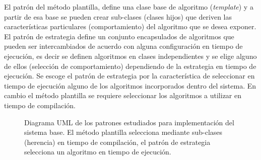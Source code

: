 El patrón del método plantilla, define una clase base de algoritmo (\textit{template}) y a partir de esa base se pueden crear sub-clases (clases hijos) que deriven las características particulares (comportamiento) del algoritmo que se desea exponer. El patrón de estrategia define un conjunto encapsulados de algoritmos que pueden ser intercambiados de acuerdo con alguna configuración en tiempo de ejecución, es decir se definen algoritmos en clases independientes y se elige alguno de ellos (selección de comportamiento) dependiendo de la estrategia en tiempo de ejecución. Se escoge el patrón de estrategia por la característica de seleccionar en tiempo de ejecución alguno de los algoritmos incorporados dentro del sistema. En cambio el método plantilla se requiere seleccionar los algoritmos a utilizar en tiempo de compilación.

\begin{figure}[h!]
\centering %
\caption[Diagrama UML de patrones de diseño \textit{Plantilla} y \textit{Estrategia}]{Diagrama UML de los patrones estudiados para implementación del sistema base. El método plantilla  selecciona mediante sub-clases (herencia) en tiempo de compilación, el patrón de estrategia selecciona un algoritmo en tiempo de ejecución.}
\label{fig:ch5:patrones_de_diseno}
\end{figure}


